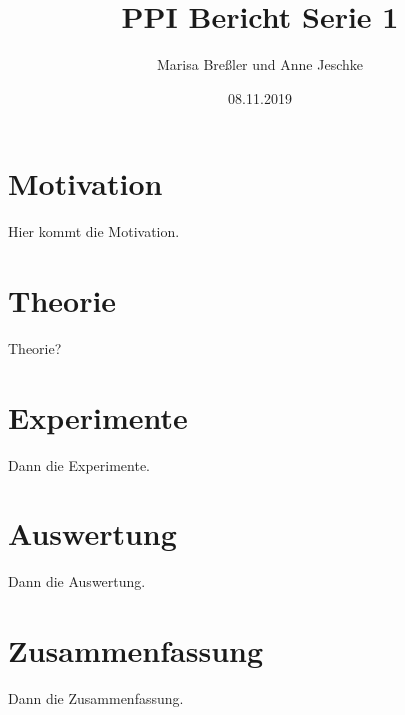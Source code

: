 \documentclass{scrartcl}
\begin{document}
\title{PPI Bericht Serie 1}
\author{Marisa Breßler und Anne Jeschke}
\date{08.11.2019}
\maketitle
\tableofcontents
\section{Motivation}
\label{sec:motivation}
Hier kommt die Motivation.
\section{Theorie}
\label{sec:theorie}
Theorie?
\section{Experimente}
\label{sec:experiment}
Dann die Experimente.
\section{Auswertung}
\label{sec:auswertung}
Dann die Auswertung.
\section{Zusammenfassung}
\label{sec:zusammenfassung}
Dann die Zusammenfassung.
\end{document}
